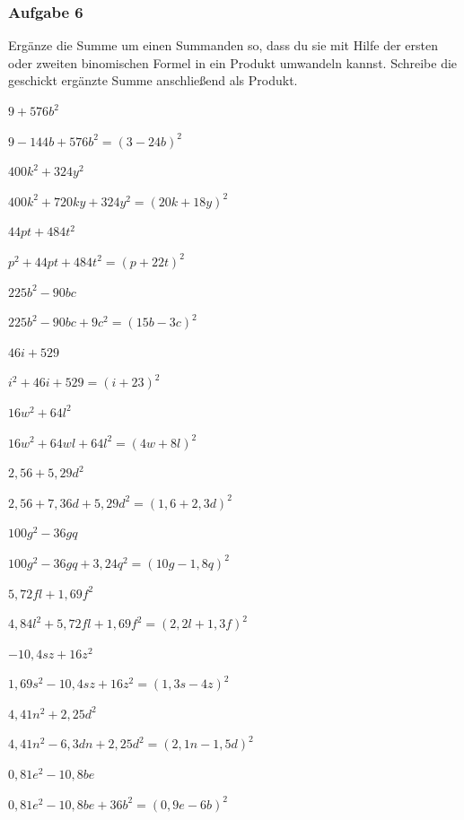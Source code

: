 \documentclass[
  ngerman,
]{book}
\begin{document}
\hypertarget{aufgabe-6}{%
\subsubsection*{Aufgabe 6}\label{aufgabe-6}}

Ergänze die Summe um einen Summanden so, dass du sie mit Hilfe der ersten oder zweiten binomischen Formel in ein Produkt umwandeln kannst. Schreibe die geschickt ergänzte Summe anschließend als Produkt.

\(9+576b^2\)

\leavevmode\hypertarget{toggleText121}{}%
\(9-144b+576b^2=(3-24b)^2\)

\(400k^2+324y^2\)

\leavevmode\hypertarget{toggleText122}{}%
\(400k^2+720ky+324y^2=(20k+18y)^2\)

\(44pt+484t^2\)

\leavevmode\hypertarget{toggleText123}{}%
\(p^2+44pt+484t^2=(p+22t)^2\)

\(225b^2-90bc\)

\leavevmode\hypertarget{toggleText124}{}%
\(225b^2-90bc+9c^2=(15b-3c)^2\)

\(46i+529\)

\leavevmode\hypertarget{toggleText125}{}%
\(i^2+46i+529=(i+23)^2\)

\(16w^2+64l^2\)

\leavevmode\hypertarget{toggleText126}{}%
\(16w^2+64wl+64l^2=(4w+8l)^2\)

\(2,56+5,29d^2\)

\leavevmode\hypertarget{toggleText127}{}%
\(2,56+7,36d+5,29d^2=(1,6+2,3d)^2\)

\(100g^2-36gq\)

\leavevmode\hypertarget{toggleText128}{}%
\(100g^2-36gq+3,24q^2=(10g-1,8q)^2\)

\(5,72fl+1,69f^2\)

\leavevmode\hypertarget{toggleText129}{}%
\(4,84l^2+5,72fl+1,69f^2=(2,2l+1,3f)^2\)

\(-10,4sz+16z^2\)

\leavevmode\hypertarget{toggleText130}{}%
\(1,69s^2-10,4sz+16z^2=(1,3s-4z)^2\)

\(4,41n^2+2,25d^2\)

\leavevmode\hypertarget{toggleText131}{}%
\(4,41n^2-6,3dn+2,25d^2=(2,1n-1,5d)^2\)

\(0,81e^2-10,8be\)

\leavevmode\hypertarget{toggleText132}{}%
\(0,81e^2-10,8be+36b^2=(0,9e-6b)^2\)
\end{document}
